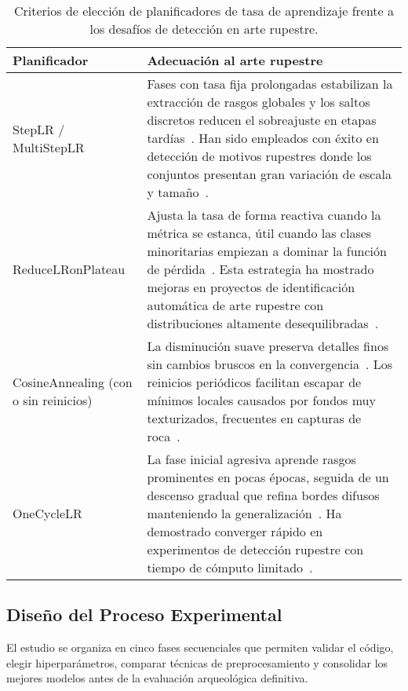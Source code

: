\begin{table}[htpb]
    \centering
    \begin{tabular}{p{3.8cm} p{10.4cm}}
        \hline
        \textbf{Planificador} & \textbf{Adecuación al arte rupestre} \\
        \hline
        StepLR / MultiStepLR &
        Fases con tasa fija prolongadas estabilizan la extracción de rasgos globales y los saltos discretos reducen el sobreajuste en etapas tardías~\cite{goyal2017,goodfellow2016deep}.
        Han sido empleados con éxito en detección de motivos rupestres donde los conjuntos presentan gran variación de escala y tamaño~\cite{suhaimi2023}. \\[0.3em]

        ReduceLRonPlateau &
        Ajusta la tasa de forma reactiva cuando la métrica se estanca, útil cuando las clases minoritarias empiezan a dominar la función de pérdida~\cite{goodfellow2016deep}.
        Esta estrategia ha mostrado mejoras en proyectos de identificación automática de arte rupestre con distribuciones altamente desequilibradas~\cite{horn2022ai}. \\[0.3em]

        CosineAnnealing (con o sin reinicios) &
        La disminución suave preserva detalles finos sin cambios bruscos en la convergencia~\cite{loshchilov2017}.
        Los reinicios periódicos facilitan escapar de mínimos locales causados por fondos muy texturizados, frecuentes en capturas de roca~\cite{sharp2024}. \\[0.3em]

        OneCycleLR &
        La fase inicial agresiva aprende rasgos prominentes en pocas épocas, seguida de un descenso gradual que refina bordes difusos manteniendo la generalización~\cite{smith2019}.
        Ha demostrado converger rápido en experimentos de detección rupestre con tiempo de cómputo limitado~\cite{suhaimi2023}. \\
    \end{tabular}
    \caption{Criterios de elección de planificadores de tasa de aprendizaje frente a los desafíos de detección en arte rupestre.}
    \label{tab:lr_schedulers}
\end{table}

\subsection{Diseño del Proceso Experimental}

El estudio se organiza en cinco fases secuenciales que permiten validar el código, elegir hiperparámetros, comparar técnicas de preprocesamiento y consolidar los mejores modelos antes de la evaluación arqueológica definitiva.

